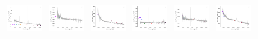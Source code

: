 \begin{center}
\begin{longtable}{l l l l l l }
    \includegraphics[width=0.3\linewidth, clip]{Figs/Figs-sdss/spec-0285-51930-0049-SPLUS-n02s23-042530.pdf} & \includegraphics[width=0.3\linewidth, clip]{Figs/Figs-sdss/spec-0285-51930-0521-SPLUS-n02n23-022190.pdf} & \includegraphics[width=0.3\linewidth, clip]{Figs/Figs-sdss/spec-0285-51930-0549-SPLUS-n01s23-038457.pdf} & \includegraphics[width=0.3\linewidth, clip]{Figs/Figs-sdss/spec-0287-52023-0264-SPLUS-n02s24-039734.pdf} & \includegraphics[width=0.3\linewidth, clip]{Figs/Figs-sdss/spec-0288-52000-0171-SPLUS-n01s26-017374.pdf} & \includegraphics[width=0.3\linewidth, clip]{Figs/Figs-sdss/spec-0288-52000-0561-SPLUS-n02n26-016552.pdf} \\

\end{longtable}
\end{center}
